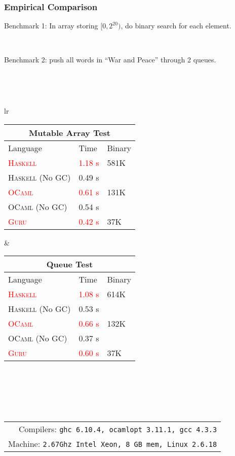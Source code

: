\documentclass[10pt]{beamer}
\begin{document}
\begin{frame}
\frametitle{Empirical Comparison}
Benchmark 1: In array storing $[0,2^{20})$, do binary search for each element.

\ 

Benchmark 2: push all words in ``War and Peace'' through 2 queues.

\ 

\ 


{\footnotesize
\begin{tabular}{lr}
\begin{tabular}{| l | l | l |}
\hline
\multicolumn{3}{|c|}{Mutable Array Test} \\
\hline
Language & Time & Binary \\
\hline
\textcolor{red}{\textsc{Haskell}} & \textcolor{red}{1.18 s} & 581K\\
\textsc{Haskell} (No GC) & 0.49 s & \ \\
\textcolor{red}{\textsc{OCaml}} & \textcolor{red}{0.61 s}  & 131K\\
\textsc{OCaml} (No GC) & 0.54 s & \ \\
\textcolor{red}{\textsc{Guru}} & \textcolor{red}{0.42 s} & 37K\\
\hline
\end{tabular}
&
\begin{tabular}{| l | l | l |}
\hline
\multicolumn{3}{|c|}{Queue Test} \\
\hline
Language & Time & Binary \\
\hline
\textcolor{red}{\textsc{Haskell}} & \textcolor{red}{1.08 s} & 614K\\
\textsc{Haskell} (No GC) & 0.53 s & \ \\
\textcolor{red}{\textsc{OCaml}} & \textcolor{red}{0.66 s} & 132K\\
\textsc{OCaml} (No GC) & 0.37 s & \ \\
\textcolor{red}{\textsc{Guru}} & \textcolor{red}{0.60 s} & 37K\\
\hline
\end{tabular}
\end{tabular}
}

\ 

\ 

\ \ \ \ \ \ \ \ \ \ \ \ \ \ \ \ \ \ \ \ \ \ \ \ \ \ \ \ \ \ \ {\footnotesize
\begin{tabular}{r}
Compilers: \texttt{ghc 6.10.4, ocamlopt 3.11.1, gcc 4.3.3} \\

Machine: \texttt{2.67Ghz Intel Xeon, 8 GB mem, Linux 2.6.18}
\end{tabular}}

\end{frame}
\end{document}
